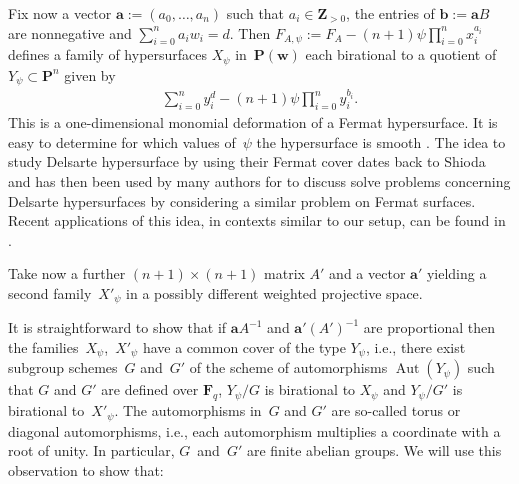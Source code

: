\documentclass[pdftex]{sigma}
\numberwithin{equation}{section}
\DeclareMathOperator{\Aut}{Aut}
\begin{document}
Fix now a vector $\mathbf{a}:=(a_0,\dots,a_n)$ such that $a_i\in \mathbf{Z}_{>0}$, the entries of $\mathbf{b}:=\mathbf{a} B$ are nonnegative and $\sum\limits_{i=0}^n a_iw_i=d$. Then $ F_{A,\psi}:=F_A-(n+1)\psi \prod\limits_{i=0}^n x_i^{a_i}$ def\/ines a family of hypersurfaces $X_{\psi}$ in~$\mathbf{P}(\mathbf{w})$ each birational to a quotient of $Y_\psi\subset \mathbf{P}^n$ given by
\begin{gather*} \sum_{i=0}^n y_i^d-(n+1)\psi \prod_{i=0}^n y_i^{b_i}.\end{gather*}
This is a one-dimensional monomial deformation of a Fermat hypersurface. It is easy to determine for which values of~$\psi$ the hypersurface is smooth \cite[Lemma~3.7]{zetafam}. The idea to study Delsarte hypersurface by using their Fermat cover dates back to Shioda~\cite{ShiExpPic} and has then been used by many authors for to discuss solve problems concerning Delsarte hypersurfaces by con\-si\-de\-ring a similar problem on Fermat surfaces. Recent applications of this idea, in contexts similar to our setup, can be found in \cite{BiniSH,BGK, KellyMirror}.

Take now a further $(n+1)\times(n+1)$ matrix $A'$ and a vector $\mathbf{a}'$ yielding a second family~$X'_{\psi}$ in a possibly dif\/ferent weighted projective space.

It is straightforward to show that if $\mathbf{a} A^{-1}$ and $\mathbf{a}' (A')^{-1}$ are proportional then the fami\-lies~$X_\psi$,~$X'_\psi$ have a common cover of the type $Y_\psi$, i.e., there exist subgroup schemes~$G$ and~$G'$ of the scheme of automorphisms $\Aut(Y_\psi)$ such that $G$ and $G'$ are def\/ined over $\mathbf{F}_q$, $Y_\psi/G$ is birational to $X_\psi$ and $Y_\psi/G'$ is birational to~$X'_{\psi}$. The automorphisms in~$G$ and $G'$ are so-called torus or diagonal automorphisms, i.e., each automorphism multiplies a coordinate with a root of unity. In particular, $G$~and~$G'$ are f\/inite abelian groups. We will use this observation to show that:
\end{document}
